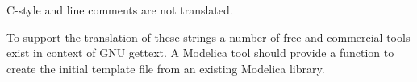 C-style and line comments are not translated.

\begin{nonnormative}
To support the translation of these strings a number of free and commercial tools exist in context of GNU gettext.
A Modelica tool should provide a function to create the initial template file from an existing Modelica library.
\end{nonnormative}

